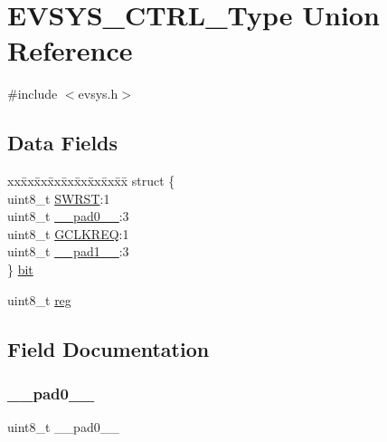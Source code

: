 \hypertarget{union_e_v_s_y_s___c_t_r_l___type}{}\section{E\+V\+S\+Y\+S\+\_\+\+C\+T\+R\+L\+\_\+\+Type Union Reference}
\label{union_e_v_s_y_s___c_t_r_l___type}


{\ttfamily \#include $<$evsys.\+h$>$}

\subsection*{Data Fields}
\begin{DoxyCompactItemize}
\item 
\begin{tabbing}
xx\=xx\=xx\=xx\=xx\=xx\=xx\=xx\=xx\=\kill
struct \{\\
\>uint8\_t \mbox{\hyperlink{union_e_v_s_y_s___c_t_r_l___type_a9334d5ac0548802c90a8129c52c8e490}{SWRST}}:1\\
\>uint8\_t \mbox{\hyperlink{union_e_v_s_y_s___c_t_r_l___type_a8b4eebe79ded0459acec2f4950102ba3}{\_\_pad0\_\_}}:3\\
\>uint8\_t \mbox{\hyperlink{union_e_v_s_y_s___c_t_r_l___type_aee1edc2a75b1462faacad09193f48d1b}{GCLKREQ}}:1\\
\>uint8\_t \mbox{\hyperlink{union_e_v_s_y_s___c_t_r_l___type_a77f12d2e278bd5c07712648ac0df5e08}{\_\_pad1\_\_}}:3\\
\} \mbox{\hyperlink{union_e_v_s_y_s___c_t_r_l___type_a9ff382f0aae4c5b8911701977155251e}{bit}}\\

\end{tabbing}\item 
uint8\+\_\+t \mbox{\hyperlink{union_e_v_s_y_s___c_t_r_l___type_a9428adc9af4653a2050e2536b55dec8d}{reg}}
\end{DoxyCompactItemize}


\subsection{Field Documentation}
\mbox{\label{union_e_v_s_y_s___c_t_r_l___type_a8b4eebe79ded0459acec2f4950102ba3}} 
\subsubsection{\texorpdfstring{\_\_pad0\_\_}{\_\_pad0\_\_}}
{\footnotesize\ttfamily uint8\+\_\+t \+\_\+\+\_\+pad0\+\_\+\+\_\+}


